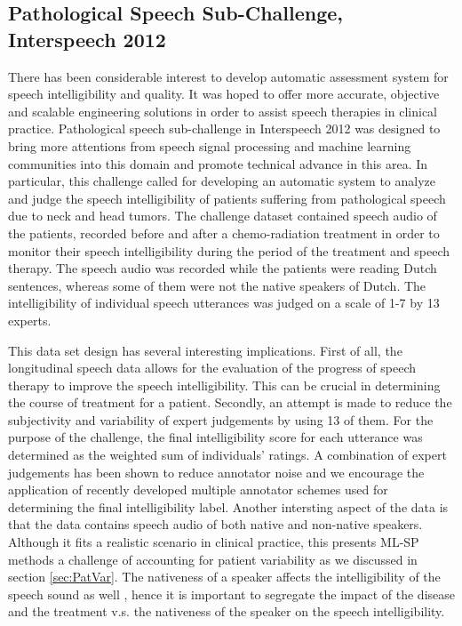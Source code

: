 \documentclass{article}
\begin{document}
\subsection{Pathological Speech Sub-Challenge, Interspeech 2012}
There has been considerable interest to develop automatic assessment system for speech intelligibility and quality. It was hoped to offer more accurate, objective and scalable engineering solutions in order to assist speech therapies in clinical practice. Pathological speech sub-challenge in Interspeech 2012 was designed to bring more attentions from speech signal processing and machine learning communities into this domain and promote technical advance in this area.
In particular, this challenge called for developing an automatic system to analyze and judge the speech intelligibility of patients suffering from pathological speech due to neck and head tumors.
The challenge dataset contained speech audio of the patients, recorded before and after a chemo-radiation treatment in order to monitor their speech intelligibility during the period of the treatment and speech therapy.
The speech audio was recorded while the patients were reading Dutch sentences, whereas some of them were not the native speakers of Dutch.
The intelligibility of individual speech utterances was judged on a scale of 1-7 by 13 experts.

This data set design has several interesting implications.
First of all, the longitudinal speech data allows for the evaluation of the progress of speech therapy to improve the speech intelligibility.
This can be crucial in determining the course of treatment for a patient.
Secondly, an attempt is made to reduce the subjectivity and variability of expert judgements by using 13 of them.
For the purpose of the challenge, the final intelligibility score for each utterance was determined as the weighted sum of individuals' ratings.
A combination of expert judgements has been shown to reduce annotator noise \cite{} and we encourage the application of recently developed multiple annotator schemes used for determining the final intelligibility label. 
Another intersting aspect of the data is that the data contains speech audio of both native and non-native speakers. Although it fits a realistic scenario in clinical practice, this presents ML-SP methods a challenge of accounting for patient variability as we discussed in section \ref{sec:PatVar}.
The nativeness of a speaker affects the intelligibility of the speech sound as well \cite{van2001intelligibility}, hence it is important to segregate the impact of the disease and the treatment v.s. the nativeness of the speaker on the speech intelligibility.
\end{document}
